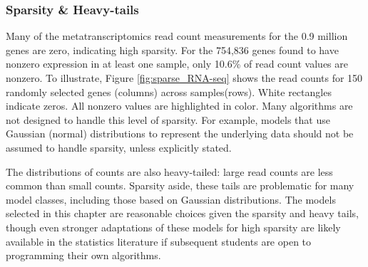 \subsubsection{Sparsity \& Heavy-tails}
Many of the metatranscriptomics read count measurements for the 0.9 million genes are zero, indicating high sparsity.
For the 754,836 genes found to have nonzero expression in at least one sample, only 10.6\% of read count values are nonzero.
To illustrate, Figure \ref{fig:sparse_RNA-seq} shows the read counts for 150 randomly selected genes (columns) across samples(rows).
White rectangles indicate zeros.  All nonzero values are highlighted in color.
Many algorithms are not designed to handle this level of sparsity.
For example, models that use Gaussian (normal) distributions to represent the underlying data should not be assumed to handle sparsity, unless explicitly stated.

The distributions of counts are also heavy-tailed: large read counts are less common than small counts.
Sparsity aside, these tails are problematic for many model classes, including those based on Gaussian distributions.
The models selected in this chapter are reasonable choices given the sparsity and heavy tails, though even stronger adaptations of these models for high sparsity are likely available in the statistics literature if subsequent students are open to programming their own algorithms.



